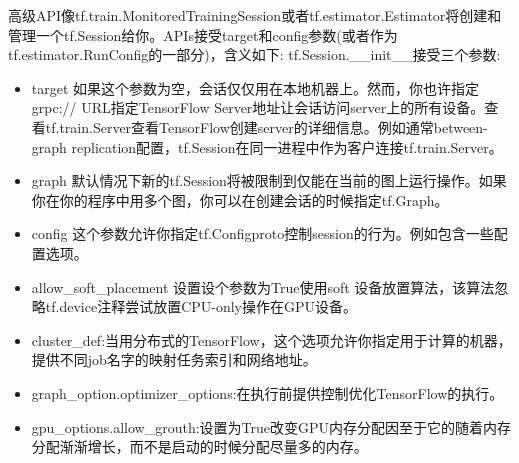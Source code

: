 高级API像tf.train.MonitoredTrainingSession或者tf.estimator.Estimator将创建和管理一个tf.Session给你。APIs接受target和config参数(或者作为tf.estimator.RunConfig的一部分)，含义如下:
tf.Session.\_\_init\_\_接受三个参数:
\begin{itemize}
	\item target 如果这个参数为空，会话仅仅用在本地机器上。然而，你也许指定grpc:// URL指定TensorFlow Server地址让会话访问server上的所有设备。查看tf.train.Server查看TensorFlow创建server的详细信息。例如通常between-graph replication配置，tf.Session在同一进程中作为客户连接tf.train.Server。
	\item graph 默认情况下新的tf.Session将被限制到仅能在当前的图上运行操作。如果你在你的程序中用多个图，你可以在创建会话的时候指定tf.Graph。
	\item config 这个参数允许你指定tf.Configproto控制session的行为。例如包含一些配置选项。
	\item allow\_soft\_placement 设置设个参数为True使用soft 设备放置算法，该算法忽略tf.device注释尝试放置CPU-only操作在GPU设备。
	\item cluster\_def:当用分布式的TensorFlow，这个选项允许你指定用于计算的机器，提供不同job名字的映射任务索引和网络地址。
	\item graph\_option.optimizer\_options:在执行前提供控制优化TensorFlow的执行。
	\item gpu\_options.allow\_grouth:设置为True改变GPU内存分配因至于它的随着内存分配渐渐增长，而不是启动的时候分配尽量多的内存。
\end{itemize}
